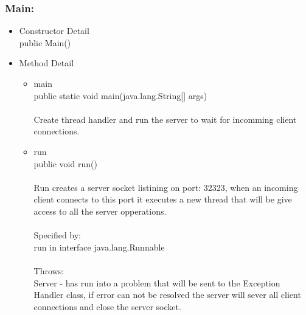 \documentclass[letterpaper]{article}
\begin{document}
				\subsubsection*{Main:}
				\vspace{0.1in}	
					\begin{itemize}
						\item	Constructor Detail \\
								public Main()
						\item	Method Detail
								\begin{itemize}
									\item	main \\
											public static void main(java.lang.String[] args) \\ \\
											Create thread handler and run the server to wait for incomming client connections.
									\item	run \\
											public void run() \\ \\
											Run creates a server socket listining on port: 32323, when an incoming client connects to this port it executes a new thread that will be give access to all the server opperations. \\ \\
											Specified by: \\
											run in interface java.lang.Runnable \\ \\
											Throws: \\
											Server - has run into a problem that will be sent to the Exception Handler class, if error can not be resolved the server will sever all client connections and close the server socket.
								\end{itemize}
					\end{itemize}
					
				\vspace{0.2in}
\end{document}
